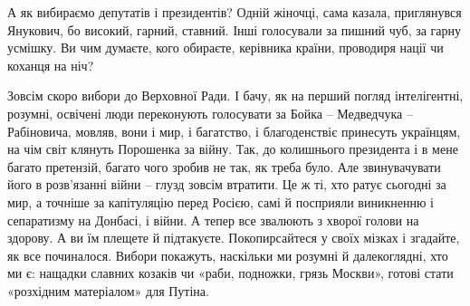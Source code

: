А як вибираємо депутатів і президентів? Одній жіночці, сама казала, приглянувся
Янукович, бо високий, гарний, ставний. Інші голосували за пишний чуб, за гарну
усмішку. Ви чим думаєте, кого обираєте, керівника країни, проводиря нації чи
коханця на ніч?

Зовсім скоро вибори до Верховної Ради. І бачу, як на перший погляд
інтелігентні, розумні, освічені люди переконують голосувати за Бойка –
Медведчука – Рабіновича, мовляв, вони і мир, і багатство, і благоденствіє
принесуть українцям, на чім світ клянуть Порошенка за війну. Так, до колишнього
президента і в мене багато претензій, багато чого зробив не так, як треба було.
Але звинувачувати його в розв’язанні війни – глузд зовсім втратити. Це ж ті,
хто ратує сьогодні за мир, а точніше за капітуляцію перед Росією, самі й
посприяли виникненню і сепаратизму на Донбасі, і війни. А тепер все звалюють з
хворої голови на здорову. А ви їм плещете й підтакуєте. Покопирсайтеся у своїх
мізках і згадайте, як все починалося. Вибори покажуть, наскільки ми розумні й
далекоглядні, хто ми є: нащадки славних козаків чи «раби, подножки, грязь
Москви», готові стати «розхідним матеріалом» для Путіна.
